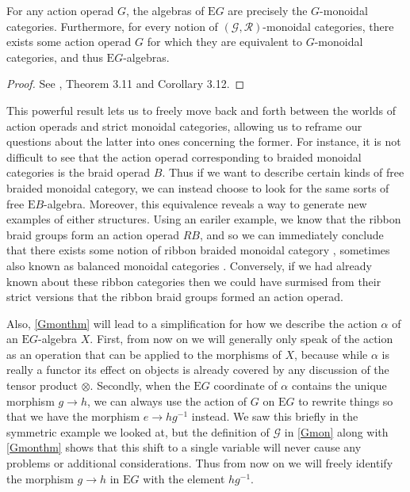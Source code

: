 \begin{thm} \label{Gmonthm} For any action operad $G$, the algebras of $\mathrm{E}G$ are precisely the $G$-monoidal categories. Furthermore, for every notion of $(\mathcal{G}, \mathcal{R})$-monoidal categories, there exists some action operad $G$ for which they are equivalent to $G$-monoidal categories, and thus $\mathrm{E}G$-algebras.
\end{thm} 
\begin{proof}
See \cite{operadborel}, Theorem 3.11 and Corollary 3.12.
\end{proof} 

This powerful result lets us to freely move back and forth between the worlds of action operads and strict monoidal categories, allowing us to reframe our questions about the latter into ones concerning the former. For instance, it is not difficult to see that the action operad corresponding to braided monoidal categories is the braid operad $B$. Thus if we want to describe certain kinds of free braided monoidal category, we can instead choose to look for the same sorts of free $\mathrm{E}B$-algebra. Moreover, this equivalence reveals a way to generate new examples of either structures. Using an eariler example, we know that the ribbon braid groups form an action operad $RB$, and so we can immediately conclude that there exists some notion of ribbon braided monoidal category \cite{ribbon1}, sometimes also known as balanced monoidal categories \cite{graphicalmon}. Conversely, if we had already known about these ribbon categories then we could have surmised from their strict versions that the ribbon braid groups formed an action operad.

Also, \cref{Gmonthm} will lead to a simplification for how we describe the action $\alpha$ of an $\mathrm{E}G$-algebra $X$. First, from now on we will generally only speak of the action as an operation that can be applied to the morphisms of $X$, because while $\alpha$ is really a functor its effect on objects is already covered by any discussion of the tensor product $\otimes$. Secondly, when the $\mathrm{E}G$ coordinate of $\alpha$ contains the unique morphism $g \to h$, we can always use the action of $G$ on $\mathrm{E}G$ to rewrite things so that we have the morphism $e \to hg^{-1}$ instead. We saw this briefly in the symmetric example we looked at, but the definition of $\mathcal{G}$ in \cref{Gmon} along with \cref{Gmonthm} shows that this shift to a single variable will never cause any problems or additional considerations. Thus from now on we will freely identify the morphism $g \to h$ in $\mathrm{E}G$ with the element $hg^{-1}$.

